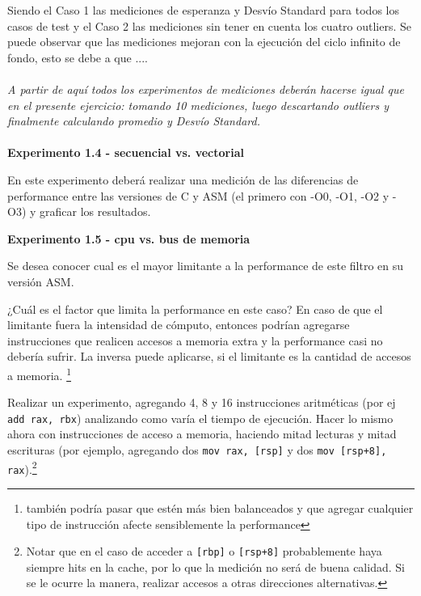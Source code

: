 \newpage
\indent Siendo el Caso 1 las mediciones de esperanza y Desvío Standard para todos los casos de test y el Caso 2 las mediciones sin tener en cuenta los cuatro outliers. Se puede observar que las mediciones mejoran con la ejecuci\'on del ciclo infinito de fondo, esto se debe a que .... \textbf{\color{red}{???????????????}} \\
\\
\textit{A partir de aquí todos los experimentos de mediciones deberán hacerse igual 
que en el presente ejercicio: tomando 10 mediciones, luego descartando 
outliers y finalmente calculando promedio y Desvío Standard.}\\
\\
\noindent\textbf{Experimento 1.4 - secuencial vs. vectorial}

En este experimento deberá realizar una medición de las diferencias de 
performance entre las versiones de C y ASM (el primero con -O0, -O1, -O2 y -O3) 
y graficar los resultados.

\vspace*{0.3cm} \noindent
\textbf{Experimento 1.5 - cpu vs. bus de memoria}

Se desea conocer cual es el mayor limitante a la
performance de este filtro en su versión ASM.

¿Cuál es el factor que limita la performance en este caso?
En caso de que el limitante fuera la intensidad de cómputo, entonces 
podrían agregarse instrucciones que realicen accesos a memoria extra y la
performance casi no debería sufrir. 
La inversa puede aplicarse, si el limitante es la cantidad de accesos a memoria.
\footnote{también podría pasar que estén más bien balanceados y que agregar
cualquier tipo de instrucción afecte sensiblemente la performance}
	
Realizar un experimento, agregando 4, 8 y 16 instrucciones aritméticas 
(por ej \verb|add rax, rbx|) analizando como varía el tiempo de ejecución.
Hacer lo mismo ahora con instrucciones de acceso a memoria, haciendo 
mitad lecturas y mitad escrituras (por ejemplo, agregando dos 
\verb|mov rax, [rsp]| y dos \verb|mov [rsp+8], rax|).\footnote{Notar que en el caso de acceder a \texttt{[rbp]} o \texttt{[rsp+8]} probablemente haya siempre hits en la cache, por lo que la medición no será de buena calidad. Si se le ocurre la manera, realizar accesos a otras direcciones alternativas.}
	
